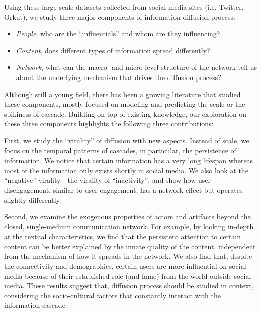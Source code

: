 \documentclass[phd,tocprelim]{cornell}
\begin{document}
Using these large scale datasets collected from social media sites (i.e. Twitter, Orkut), we study three major components of information diffusion process:
\begin{itemize}
\item \emph{People}, who are the ``influentials'' and whom are they influencing?
\item \emph{Content}, does different types of information spread differently?
\item \emph{Network}, what can the macro- and micro-level structure of the network tell us about the underlying mechanism that drives the diffusion process?
\end{itemize}

Although still a young field, there has been a growing literature that studied these components, mostly focused on modeling and predicting the scale or the spikiness of cascade. Building on top of existing knowledge, our exploration on these three components highlights the following three contributions:



First, we study the ``virality'' of diffusion with new aspects. Instead of scale, we focus on the temporal patterns of cascades, in particular, the persistence of information. We notice that certain information has a very long lifespan whereas most of the information only exists shortly in social media. We also look at the ``negative'' virality - the virality of ``inactivity'', and show how user disengagement, similar to user engagement, has a network effect but operates slightly differently.

Second, we examine the exogenous properties of actors and artifacts beyond the closed, single-medium communication network. For example, by looking in-depth at the textual characteristics, we find that the persistent attention to certain content can be better explained by the innate quality of the content, independent from the mechanism of how it spreads in the network. We also find that, despite the connectivity and demographics, certain users are more influential on social media because of their established role (and fame) from the world outside social media. These results suggest that, diffusion process should be studied in context, considering the socio-cultural factors that constantly interact with the information cascade.
\end{document}
